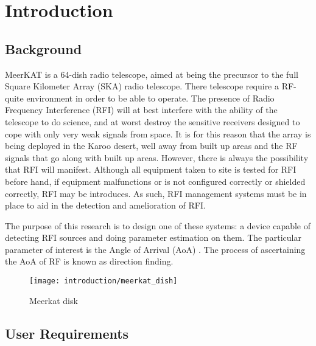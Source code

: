 \chapter{Introduction}
\section{Background}
MeerKAT is a 64-dish radio telescope, aimed at being the precursor to the full Square Kilometer Array (SKA)  radio telescope. 
There telescope require a RF-quite environment in order to be able to operate. The presence of Radio Frequency Interference (RFI)  will at best interfere with the ability of the telescope to do science, and at worst destroy the sensitive receivers designed to cope with only very weak signals from space. 
It is for this reason that the array is being deployed in the Karoo desert, well away from built up areas and the RF signals that go along with built up areas. 
However, there is always the possibility that RFI will manifest. Although all equipment taken to site is tested for RFI before hand, if equipment malfunctions or is not configured correctly or shielded correctly, RFI may be introduces.
As such, RFI management systems must be in place to aid in the detection and amelioration of RFI. 

The purpose of this research is to design one of these systems: a device capable of detecting RFI sources and doing parameter estimation on them. The particular parameter of interest is the Angle of Arrival (AoA) . The process of ascertaining the AoA of RF is known as direction finding.

\begin{wrapfigure}{r}{0.4\textwidth}
  \centering
  \texttt{[image: introduction/meerkat\_dish]}
  \caption{Meerkat disk}
\end{wrapfigure}

\section{User Requirements}

